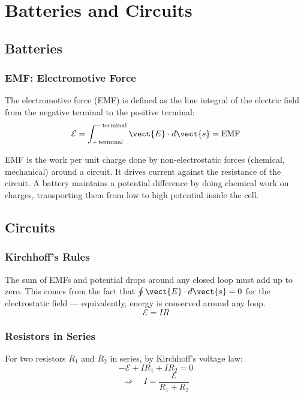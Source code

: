 \chapter{Batteries and Circuits}

\section{Batteries}

\subsection{EMF: Electromotive Force}

\begin{definition}[EMF]
The electromotive force (EMF) is defined as the line integral of the electric field from the negative terminal to the positive terminal:
\[
    \mathcal{E} = \int_{+\,\text{terminal}}^{-\,\text{terminal}} \vect{E}\cdot d\vect{s} = \text{EMF}
\]
\end{definition}

EMF is the work per unit charge done by non-electrostatic forces (chemical, mechanical) around a circuit. It drives current against the resistance of the circuit. A battery maintains a potential difference by doing chemical work on charges, transporting them from low to high potential inside the cell.

\section{Circuits}

\subsection{Kirchhoff's Rules}

\begin{theorem}
The sum of EMFs and potential drops around any closed loop must add up to zero. This comes from the fact that $\oint \vect{E}\cdot d\vect{s} = 0$ for the electrostatic field — equivalently, energy is conserved around any loop.
\[
    \mathcal{E} = IR
\]
\end{theorem}

\subsection{Resistors in Series}

For two resistors $R_1$ and $R_2$ in series, by Kirchhoff's voltage law:
\[
    -\mathcal{E} + IR_1 + IR_2 = 0
\]
\[
    \Rightarrow \quad I = \frac{\mathcal{E}}{R_1 + R_2}
\]

